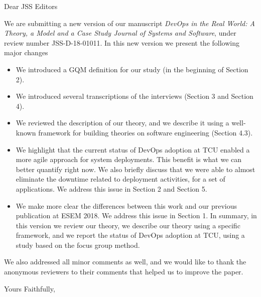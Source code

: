 \documentclass{letter}
\begin{document}
\begin{letter}{}
\opening{Dear JSS Editors}

We are submitting a new version of our manuscript
\emph{DevOps in the Real World: A Theory, a Model and a Case Study
  Journal of Systems and Software}, under review number JSS-D-18-01011.
In this new version we present the following major changes

\begin{itemize}
\item We introduced a GQM definition for our study (in the
  beginning of Section 2).
  
\item We introduced several
transcriptions of the interviews (Section 3 and Section 4).

\item We reviewed the description of our theory, and we
  describe it using a well-known framework for building
  theories on software engineering (Section 4.3).

\item We highlight that the current status of DevOps adoption
  at TCU enabled a more agile approach for system deployments.
  This benefit is what we can better quantify right now. We also
  briefly discuss that we were able to almost eliminate
  the downtime related to deployment activities, for a set
  of applications. We address this issue in Section 2 and
  Section 5. 

\item We make more clear the differences between this work
  and our previous publication at ESEM 2018. We address
  this issue in Section 1. In summary, in this version we
  review our theory, we describe our theory using a
  specific framework, and we report the status of DevOps
  adoption at TCU, using a study based on the focus group
  method.

\end{itemize}

We also addressed all minor comments as well, and we
would like to thank the anonymous reviewers to their
comments that helped us to improve the paper. 

\closing{Yours Faithfully,}

\end{letter}
\end{document}
